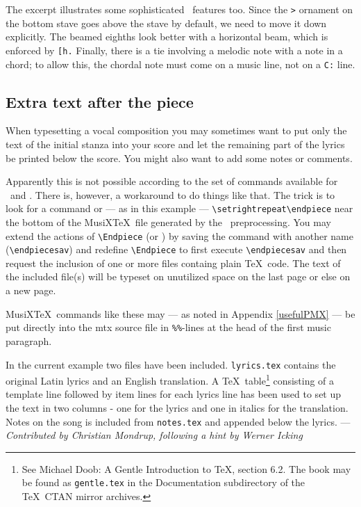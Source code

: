\documentclass[11pt]{article}
\begin{document}
The excerpt illustrates some sophisticated \PMX\ features too.
Since the \verb">" ornament on the bottom stave 
goes above the stave by default, we
need to move it down explicitly.  The beamed eighths look better with
a horizontal beam, which is enforced by \verb"[h."  Finally, there is
a tie involving a melodic note with a note in a chord; to allow this, 
the chordal note must
come on a music line, not on a \texttt{C:} line.
\pagebreak

\subsection{Extra text after the piece} \label{extra}  




When typesetting a vocal composition you may sometimes want to put only the
text of the initial stanza into your score and let the remaining part of the
lyrics be printed below the score. You might also want to add some notes or
comments.

Apparently this is not possible according to the set of commands available
for \MTx\ and \PMX. There is, however, a workaround to do things like
that. The trick is to look for a command  or --- as in
this example --- \verb'\setrightrepeat\endpiece' near the bottom of the
MusiX\TeX\ file generated by the \PMX\ preprocessing. You may extend the
actions of \verb'\Endpiece' (or ) by saving the command
with another name (\verb'\endpiecesav') and redefine \verb'\Endpiece'
to first execute \verb'\endpiecesav' and then request the inclusion of
one or more files containg plain \TeX\ code. The text of the included
file(s) will be typeset on unutilized space on the last page or else on
a new page.

MusiX\TeX\ commands like these may --- as noted in Appendix \ref{usefulPMX}
--- be put directly into the mtx source file in \verb"%%"-lines at the
head of the first music paragraph.

In the current example two files have been included. \texttt{lyrics.tex}
contains the original Latin lyrics and an English translation. A \TeX\
table\footnote{See Michael Doob: A Gentle Introduction to \TeX, section
6.2. The book may be found as \texttt{gentle.tex} in the Documentation
subdirectory of the \TeX\ CTAN mirror archives.} consisting of a template
line followed by item lines for each lyrics line has been used to set
up the text in two columns - one for the lyrics and one in italics for
the translation. Notes on the song is included from \texttt{notes.tex}
and appended below the lyrics.
\hfill --- \textsl{Contributed by Christian Mondrup, following a hint by
Werner Icking}
\end{document}
